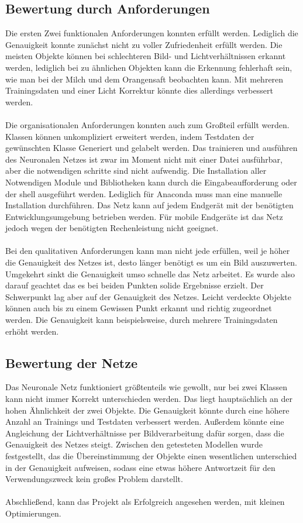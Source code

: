 \documentclass[a4paper,12pt,oneside]{article}
\begin{document}
\subsection{Bewertung durch Anforderungen}

Die ersten Zwei funktionalen Anforderungen konnten erfüllt werden. Lediglich die Genauigkeit konnte zunächst nicht zu voller Zufriedenheit erfüllt werden. Die meisten Objekte können bei schlechteren Bild- und Lichtverhältnissen erkannt werden, lediglich bei zu ähnlichen Objekten kann die Erkennung fehlerhaft sein, wie man bei der Milch und dem Orangensaft beobachten kann. Mit mehreren Trainingsdaten und einer Licht Korrektur könnte dies allerdings verbessert werden.\\
\\
Die organisationalen Anforderungen konnten auch zum Großteil erfüllt werden. Klassen können unkompliziert erweitert werden, indem Testdaten der gewünschten Klasse Generiert und gelabelt werden. Das trainieren und ausführen des Neuronalen Netzes ist zwar im Moment nicht mit einer Datei ausführbar, aber die notwendigen schritte sind nicht aufwendig. Die Installation aller Notwendigen Module und Bibliotheken kann durch die Eingabeaufforderung oder der shell ausgeführt werden. Lediglich für Anaconda muss man eine manuelle Installation durchführen. Das Netz kann auf jedem Endgerät mit der benötigten Entwicklungsumgebung betrieben werden. Für mobile Endgeräte ist das Netz jedoch wegen der benötigten Rechenleistung nicht geeignet.\\
\\
Bei den qualitativen Anforderungen kann man nicht jede erfüllen, weil je höher die Genauigkeit des Netzes ist, desto länger benötigt es um ein Bild auszuwerten. Umgekehrt sinkt die Genauigkeit umso schnelle das Netz arbeitet. Es wurde also darauf geachtet das es bei beiden Punkten solide Ergebnisse erzielt. Der Schwerpunkt lag aber auf der Genauigkeit des Netzes. Leicht verdeckte Objekte können auch bis zu einem Gewissen Punkt erkannt und richtig zugeordnet werden. Die Genauigkeit kann beispielsweise, durch mehrere Trainingsdaten erhöht werden.\\

\subsection{Bewertung der Netze}
Das Neuronale Netz funktioniert größtenteils wie gewollt, nur bei zwei Klassen kann nicht immer Korrekt unterschieden werden. Das liegt hauptsächlich an der hohen Ähnlichkeit der zwei Objekte. Die Genauigkeit könnte durch eine höhere Anzahl an Trainings und Testdaten verbessert werden. Außerdem könnte eine Angleichung der Lichtverhältnisse per Bildverarbeitung dafür sorgen, dass die Genauigkeit des Netzes steigt. Zwischen den getesteten Modellen wurde festgestellt, das die Übereinstimmung der Objekte einen wesentlichen unterschied in der Genauigkeit aufweisen, sodass eine etwas höhere Antwortzeit für den Verwendungszweck kein großes Problem darstellt.\\
\\
Abschließend, kann das Projekt als Erfolgreich angesehen werden, mit kleinen Optimierungen.
\end{document}

